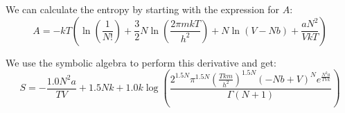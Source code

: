 \documentclass[10pt]{article}
\begin{document}
We can calculate the entropy by starting with the expression for \( A \):
\begin{equation}
  A = - k T \left( \ln \left( \frac{1}{N !} \right) + \frac{3}{2} N \ln \left( \frac{2 \pi m k T}{h^{2}} \right) + N \ln \left( V-N b \right) + \frac{a N^{2}}{V k T} \right)
\end{equation}

We use the symbolic algebra to perform this derivative and get:
\begin{equation}
  S = - \frac{1.0 N^{2} a}{T V} + 1.5 N k + 1.0 k \log{\left(\frac{2^{1.5 N} \pi^{1.5 N} \left(\frac{T k m}{h^{2}}\right)^{1.5 N} \left(- N b + V\right)^{N} e^{\frac{N^{2} a}{T V k}}}{\Gamma\left(N + 1\right)} \right)}
\end{equation}

\section{}
\end{document}
